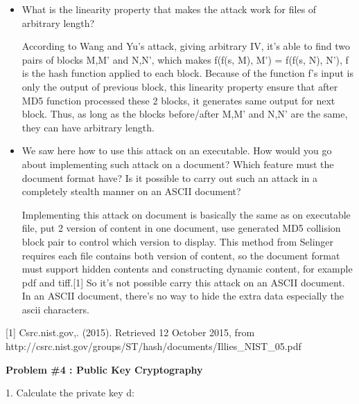 \documentclass[12pt]{article}  %
\begin{document}
\begin{itemize}
      \item What is the linearity property that makes the attack work for files of arbitrary length?

      According to Wang and Yu's attack, giving arbitrary IV, it's able to find two pairs of blocks M,M' and N,N', which makes f(f(s, M), M') = f(f(s, N), N'), f is the hash function applied to each block. Because of the function f's input is only the output of previous block, this linearity property ensure that after MD5 function processed these 2 blocks, it generates same output for next block. Thus, as long as the blocks before/after M,M' and N,N' are the same, they can have arbitrary length.
          
      \item We saw here how to use this attack on an executable. How would you go about implementing such attack on a document? Which feature must the document format have? Is it possible to carry out such an attack in a completely stealth manner on an ASCII document?

     Implementing this attack on document is basically the same as on executable file, put 2 version of content in one document, use generated MD5 collision block pair to control which version to display. This method from  Selinger requires each file contains both version of content, so the document format must support hidden contents and constructing dynamic content, for example pdf and tiff.[1] So it's not possible carry this attack on an ASCII document. In an ASCII document, there's no way to hide the extra data especially the ascii characters.
\end{itemize}

[1] Csrc.nist.gov,. (2015). Retrieved 12 October 2015, from http://csrc.nist.gov/groups/ST/hash/documents/Illies\_NIST\_05.pdf

%
%
\newpage
\begin{center}
\textbf{Problem \#4 : Public Key Cryptography}
\end{center}

1. Calculate the private key d:
\end{document}
